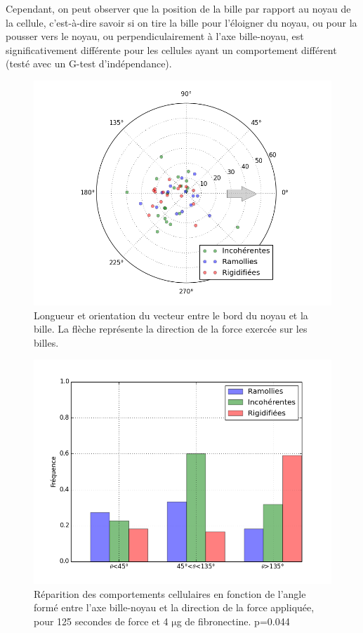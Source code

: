 \documentclass{report}
\newcommand{\micro}{$\mathrm{\mu}$}
\begin{document}
Cependant, on peut observer que la position de la bille par rapport au noyau de la cellule, c'est-à-dire savoir si on tire la bille pour l'éloigner du noyau, ou pour la pousser vers le noyau, ou perpendiculairement à l'axe bille-noyau, est significativement différente pour les cellules ayant un comportement différent (testé avec un G-test d'indépendance). 
\begin{figure}
\includegraphics[scale=0.5]{Figures/Positions_FRI.png} 
\caption{Longueur et orientation du vecteur entre le bord du noyau et la bille. La flèche représente la direction de la force exercée sur les billes.}
\end{figure}
\begin{figure}
\includegraphics[scale=0.5]{Figures/Hist_Angles.png} 
\caption{Réparition des comportements cellulaires en fonction de l'angle formé entre l'axe bille-noyau et la direction de la force appliquée, pour 125 secondes de force et 4 \micro g de fibronectine. p=0.044 \label{Angle_C4}}
\end{figure}
\end{document}
